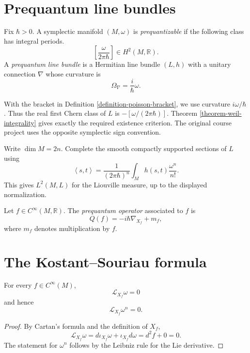 \section{Prequantum line bundles}
\label{section-prequantum-line-bundles}

\begin{definition}
\label{definition-prequantizable}
Fix $\hbar>0$. A symplectic manifold
$(M,\omega)$ is \emph{prequantizable} if
the following class has integral periods.
$$
\left[\frac{\omega}{2\pi\hbar}\right]
\in H^2(M,\mathbb{R}).
$$
A {\it prequantum line bundle} is a
Hermitian line bundle $(L,h)$ with a unitary
connection $\nabla$ whose curvature is
$$
\Omega_\nabla=\frac{i}{\hbar}\omega.
$$
\end{definition}

\noindent
With the bracket in Definition
\ref{definition-poisson-bracket}, we use
curvature $i\omega/\hbar$. Thus the real
first Chern class of $L$ is
$-[\omega/(2\pi\hbar)]$. Theorem
\ref{theorem-weil-integrality} gives exactly
the required existence criterion. The
original course project uses the opposite
symplectic sign convention.

\medskip\noindent
Write $\dim M=2n$. Complete the smooth
compactly supported sections of $L$ using
$$
\left\langle{} s,t\right\rangle{}
=
\frac{1}{(2\pi\hbar)^n}
\int_M h(s,t)\frac{\omega^n}{n!}.
$$
This gives $L^2(M,L)$ for the Liouville
measure, up to the displayed normalization.

\begin{definition}
\label{definition-prequantum-operator}
Let $f\in C^\infty(M,\mathbb{R})$.
The {\it prequantum operator} associated to
$f$ is
$$
Q(f)=-i\hbar\nabla_{X_f}+m_f,
$$
where $m_f$ denotes multiplication by $f$.
\end{definition}

\section{The Kostant--Souriau formula}
\label{section-kostant-souriau-formula}

\begin{lemma}
\label{lemma-hamiltonian-volume-preserving}
For every $f\in C^\infty(M)$,
$$
\mathcal L_{X_f}\omega=0
$$
and hence
$$
\mathcal L_{X_f}\omega^n=0.
$$
\end{lemma}

\begin{proof}
By Cartan's formula and the definition of
$X_f$,
$$
\mathcal L_{X_f}\omega
=d\iota_{X_f}\omega+
\iota_{X_f}d\omega
=d^2f+0=0.
$$
The statement for $\omega^n$ follows by the
Leibniz rule for the Lie derivative.
\end{proof}

